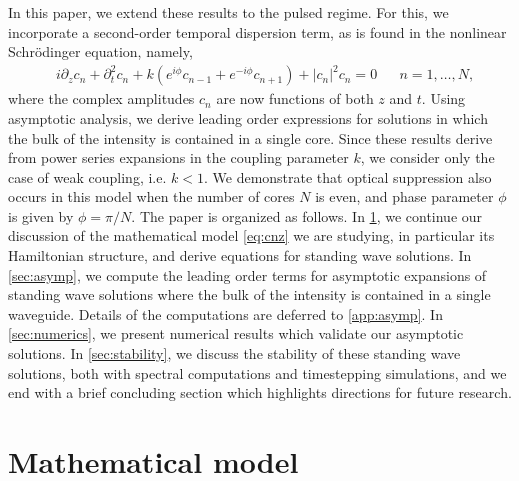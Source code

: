 \documentclass[11pt,reqno]{amsart}
\begin{document}
In this paper, we extend these results to the pulsed regime. For this, we incorporate a second-order temporal dispersion term, as is found in the nonlinear Schr\"odinger equation, namely,
\begin{align}\label{eq:cnz}
&i\partial_z c_n + \partial_t^2 c_n + k\left(e^{i\phi}c_{n-1}+e^{-i\phi}c_{n+1}\right)+|c_n|^2 c_n = 0 && n = 1, \dots, N,
\end{align}
where the complex amplitudes $c_n$ are now functions of both $z$ and $t$. Using asymptotic analysis, we derive leading order expressions for solutions in which the bulk of the intensity is contained in a single core. Since these results derive from power series expansions in the coupling parameter $k$, we consider only the case of weak coupling, i.e. $k < 1$.
We demonstrate that optical suppression also occurs in this model when the number of cores $N$ is even, and phase parameter $\phi$ is given by $\phi=\pi/N$. The paper is organized as follows. In \cref{sec:model}, we continue our discussion of the mathematical model \cref{eq:cnz} we are studying, in particular its Hamiltonian structure, and derive equations for standing wave solutions. In \cref{sec:asymp}, we compute the leading order terms for asymptotic expansions of standing wave solutions where the bulk of the intensity is contained in a single waveguide. Details of the computations are deferred to \cref{app:asymp}. In \cref{sec:numerics}, we present numerical results which validate our asymptotic solutions. In \cref{sec:stability}, we discuss the stability of these standing wave solutions, both with spectral computations and timestepping simulations, and we end with a brief concluding section which highlights directions for future research.

\section{Mathematical model}\label{sec:model}
\end{document}

